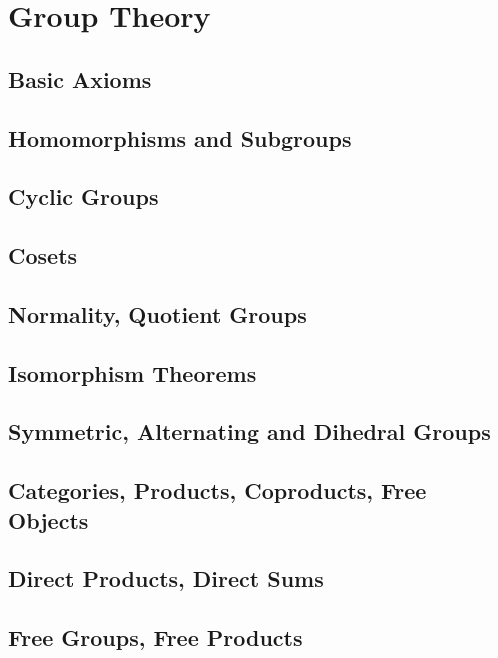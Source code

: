 \documentclass[a4paper,8pt]{article}
\theoremstyle{theorem}
\begin{document}
\newpage

\section{Group Theory}

\subsection{Basic Axioms}

\subsection{Homomorphisms and Subgroups}

\subsection{Cyclic Groups}

\subsection{Cosets}

\subsection{Normality, Quotient Groups}

\subsection{Isomorphism Theorems}

\subsection{Symmetric, Alternating and Dihedral Groups}

\subsection{Categories, Products, Coproducts, Free Objects}

\subsection{Direct Products, Direct Sums}

\subsection{Free Groups, Free Products}
\end{document}
